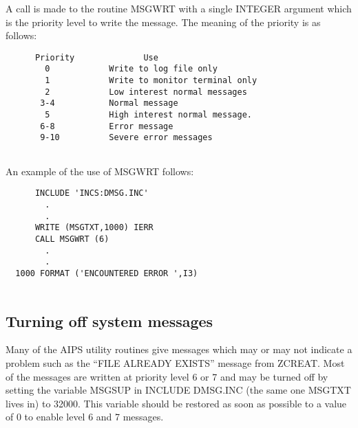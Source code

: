 A call is made to the routine MSGWRT with a single INTEGER
argument which is the priority level to write the message.  The
meaning of the priority is as follows:

\begin{verbatim}
      Priority              Use
        0            Write to log file only
        1            Write to monitor terminal only
        2            Low interest normal messages
       3-4           Normal message
        5            High interest normal message.
       6-8           Error message
       9-10          Severe error messages


\end{verbatim}
An example of the use of MSGWRT follows:

\begin{verbatim}
      INCLUDE 'INCS:DMSG.INC'
        .
        .
      WRITE (MSGTXT,1000) IERR
      CALL MSGWRT (6)
        .
        .
  1000 FORMAT ('ENCOUNTERED ERROR ',I3)


\end{verbatim}

\subsection{Turning off system messages}
 Many of the  AIPS utility routines  give messages which may or may
not indicate a problem such as the ``FILE ALREADY EXISTS'' message from
ZCREAT.  Most of the messages are written at priority level 6 or 7 and
may be turned off by setting the variable MSGSUP in INCLUDE DMSG.INC
(the same one MSGTXT lives in) to 32000.  This variable should be
restored as soon as possible to a value of 0 to enable level 6 and 7
messages.


